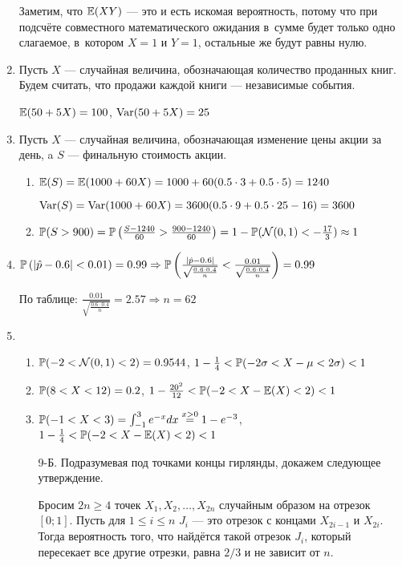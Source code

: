\begin{enumerate}
Заметим, что $\E(XY)$ — это и есть искомая вероятность, потому что при подсчёте совместного математического ожидания в~сумме
будет только одно слагаемое, в~котором $X=1$ и $Y=1$, остальные же будут равны нулю.
\item Пусть $X$ — случайная величина, обозначающая количество проданных книг. Будем считать, что продажи каждой книги —
независимые события.

$\E(50 + 5X) = 100$, $\Var(50 + 5X) = 25$
\item Пусть $X$ — случайная величина, обозначающая изменение цены акции за день, a $S$ —  финальную стоимость акции.
\begin{enumerate}
\item $\E(S) = \E(1000 + 60X) = 1000 + 60 (0.5 \cdot 3 + 0.5 \cdot 5) = 1240$

$\Var(S) = \Var(1000 + 60X) = 3600(0.5 \cdot 9 + 0.5 \cdot 25 - 16) = 3600$
\item $\P(S > 900) = \P\left(\frac{S-1240}{60} > \frac{900-1240}{60} \right) = 1 - \P(\cN(0,1)< -\frac{17}{3}) \approx 1$
\end{enumerate}
\item $\P\left(|\hat{p} - 0.6| <0.01\right) = 0.99 \Rightarrow \P\left(\frac{|\hat{p} - 0.6|}{\sqrt{\frac{0.6\cdot0.4}{n}}} < \frac{0.01}{\sqrt{\frac{0.6\cdot0.4}{n}}} \right)=0.99 $

По таблице: $\frac{0.01}{\sqrt{\frac{0.6\cdot0.4}{n}}}  = 2.57 \Rightarrow n=62 $
\item
\begin{enumerate}
\item $\P(-2 < \cN(0,1) < 2) = 0.9544$, $1 - \frac{1}{4} < \P(-2\sigma<X-\mu<2\sigma) < 1$
\item $\P(8<X<12) = 0.2$, $1 - \frac{20^2}{12} < \P(-2 < X - \E(X) < 2)< 1$
\item $\P(-1 < X < 3) = \int_{-1}^{3} e^{-x} dx \stackrel{x>0}{=} 1 - e^{-3}$, $1- \frac{1}{4} < \P(-2<X-\E(X)<2) < 1$

\item[9-Б.]
Подразумевая под точками концы гирлянды, докажем следующее утверждение.

Бросим $2n \geq 4$ точек $X_1, X_2, \ldots, X_{2n}$ случайным образом на отрезок $[0;1]$. Пусть для $1 \leq i \leq n$ $J_i$ — это отрезок с концами $X_{2i-1}$ и $X_{2i}$.
Тогда вероятность того, что найдётся такой отрезок $J_i$, который пересекает все другие отрезки, равна $2/3$ и не зависит от $n$.


\end{enumerate}
\end{enumerate}

